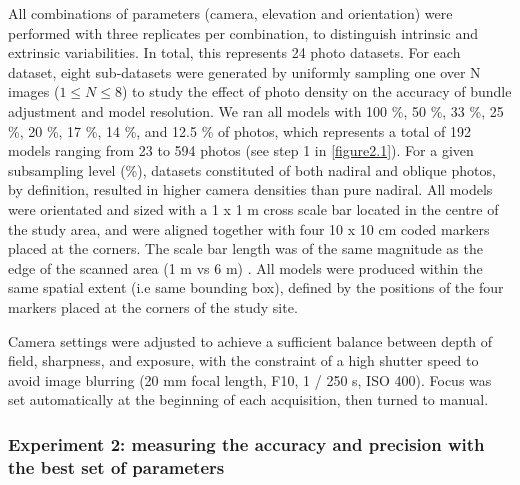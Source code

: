 All combinations of parameters (camera, elevation and orientation) were performed with three replicates per combination, to distinguish intrinsic and extrinsic variabilities. In total, this represents 24 photo datasets. For each dataset, eight sub-datasets were generated by uniformly sampling one over N images ($1 \leq N \leq 8$) to study the effect of photo density on the accuracy of bundle adjustment and model resolution. We ran all models with 100 \%, 50 \%, 33 \%, 25 \%, 20 \%, 17 \%, 14 \%, and 12.5 \% of photos, which represents a total of 192 models ranging from 23 to 594 photos (see step 1 in \autoref{figure2.1}). For a given subsampling level (\%), datasets constituted of both nadiral and oblique photos, by definition, resulted in higher camera densities than pure nadiral. All models were orientated and sized with a 1 x 1 m cross scale bar located in the centre of the study area, and were aligned together with four 10 x 10 cm coded markers placed at the corners. The scale bar length was of the same magnitude as the edge of the scanned area (1 m vs 6 m) \citep{vdi/vde_optical_2002}. All models were produced within the same spatial extent (i.e same bounding box), defined by the positions of the four markers placed at the corners of the study site.

Camera settings were adjusted to achieve a sufficient balance between depth of field, sharpness, and exposure, with the constraint of a high shutter speed to avoid image blurring (20 mm focal length, F10, 1 / 250 s, ISO 400). Focus was set automatically at the beginning of each acquisition, then turned to manual.

\subsubsection{Experiment 2: measuring the accuracy and precision with the best set of parameters}\label{chapitre2_2.1.2}

